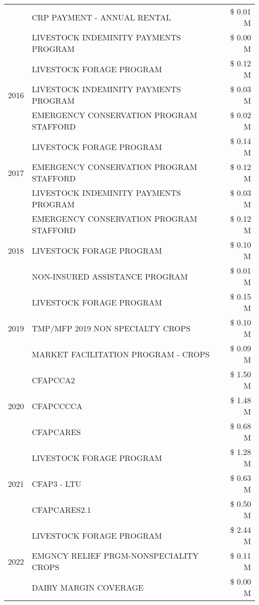 \begin{tabular}{llr}
 & CRP PAYMENT - ANNUAL RENTAL & \$ 0.01 M \\
 & LIVESTOCK INDEMINITY PAYMENTS PROGRAM & \$ 0.00 M \\
\cline{1-3}
\multirow[t]{3}{*}{2016} & LIVESTOCK FORAGE PROGRAM & \$ 0.12 M \\
 & LIVESTOCK INDEMINITY PAYMENTS PROGRAM & \$ 0.03 M \\
 & EMERGENCY CONSERVATION PROGRAM STAFFORD & \$ 0.02 M \\
\cline{1-3}
\multirow[t]{3}{*}{2017} & LIVESTOCK FORAGE PROGRAM & \$ 0.14 M \\
 & EMERGENCY CONSERVATION PROGRAM STAFFORD & \$ 0.12 M \\
 & LIVESTOCK INDEMINITY PAYMENTS PROGRAM & \$ 0.03 M \\
\cline{1-3}
\multirow[t]{3}{*}{2018} & EMERGENCY CONSERVATION PROGRAM STAFFORD & \$ 0.12 M \\
 & LIVESTOCK FORAGE PROGRAM & \$ 0.10 M \\
 & NON-INSURED ASSISTANCE PROGRAM & \$ 0.01 M \\
\cline{1-3}
\multirow[t]{3}{*}{2019} & LIVESTOCK FORAGE PROGRAM & \$ 0.15 M \\
 & TMP/MFP 2019 NON SPECIALTY CROPS & \$ 0.10 M \\
 & MARKET FACILITATION PROGRAM - CROPS & \$ 0.09 M \\
\cline{1-3}
\multirow[t]{3}{*}{2020} & CFAPCCA2 & \$ 1.50 M \\
 & CFAPCCCCA & \$ 1.48 M \\
 & CFAPCARES & \$ 0.68 M \\
\cline{1-3}
\multirow[t]{3}{*}{2021} & LIVESTOCK FORAGE PROGRAM & \$ 1.28 M \\
 & CFAP3 - LTU & \$ 0.63 M \\
 & CFAPCARES2.1 & \$ 0.50 M \\
\cline{1-3}
\multirow[t]{3}{*}{2022} & LIVESTOCK FORAGE PROGRAM & \$ 2.44 M \\
 & EMGNCY RELIEF PRGM-NONSPECIALITY CROPS & \$ 0.11 M \\
 & DAIRY MARGIN COVERAGE & \$ 0.00 M \\
\cline{1-3}
\bottomrule
\end{tabular}

